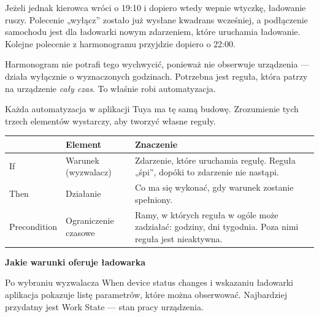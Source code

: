 \documentclass[11pt]{article}
\begin{document}
Jeżeli jednak kierowca wróci o 19:10 i dopiero wtedy wepnie wtyczkę, ładowanie ruszy. Polecenie „wyłącz” zostało już wysłane kwadrans wcześniej, a podłączenie samochodu jest dla ładowarki nowym zdarzeniem, które uruchamia ładowanie. Kolejne polecenie z harmonogramu przyjdzie dopiero o 22:00.

Harmonogram nie potrafi tego wychwycić, ponieważ nie obserwuje urządzenia — działa wyłącznie o wyznaczonych godzinach. Potrzebna jest reguła, która patrzy na urządzenie \emph{cały czas}. To właśnie robi automatyzacja.

\clearpage


Każda automatyzacja w aplikacji Tuya ma tę samą budowę. Zrozumienie tych trzech elementów wystarczy, aby tworzyć własne reguły.

\vspace{0.3cm}
\begin{tabularx}{\textwidth}{@{}p{2.7cm}p{3.9cm}X@{}}
\toprule
& \textbf{\color{apnavy}Element} & \textbf{\color{apnavy}Znaczenie}\\
\midrule
If & Warunek (wyzwalacz) & Zdarzenie, które uruchamia regułę. Reguła „śpi”, dopóki to zdarzenie nie nastąpi.\\
Then & Działanie & Co ma się wykonać, gdy warunek zostanie spełniony.\\
Precondition & Ograniczenie czasowe & Ramy, w których reguła w ogóle może zadziałać: godziny, dni tygodnia. Poza nimi reguła jest nieaktywna.\\
\bottomrule
\end{tabularx}


\vspace{0.35cm}
{\bfseries\color{apnavy}\large Jakie warunki oferuje ładowarka}

Po wybraniu wyzwalacza When device status changes i wskazaniu ładowarki aplikacja pokazuje listę parametrów, które można obserwować. Najbardziej przydatny jest Work State — stan pracy urządzenia.
\end{document}
